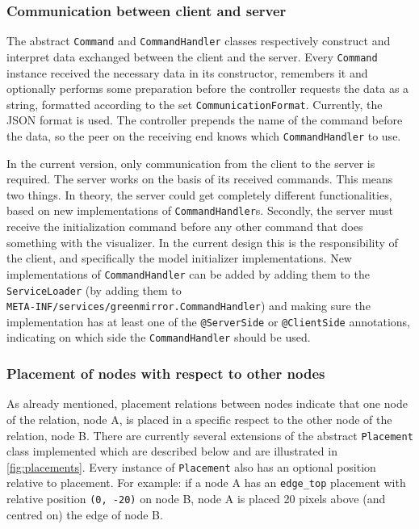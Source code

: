 \documentclass[a4paper]{article}
\begin{document}
\subsubsection{Communication between client and server}\label{subsubsec:communication}
The abstract \lstinline{Command} and \lstinline{CommandHandler} classes respectively construct and interpret data exchanged between the client and the server. Every \lstinline{Command} instance received the necessary data in its constructor, remembers it and optionally performs some preparation before the controller requests the data as a string, formatted according to the set \lstinline{CommunicationFormat}. Currently, the JSON format is used. The controller prepends the name of the command before the data, so the peer on the receiving end knows which \lstinline{CommandHandler} to use.

In the current version, only communication from the client to the server is required. The server works on the basis of its received commands. This means two things. In theory, the server could get completely different functionalities, based on new implementations of \lstinline{CommandHandler}s. Secondly, the server must receive the initialization command before any other command that does something with the visualizer. In the current design this is the responsibility of the client, and specifically the model initializer implementations. New implementations of \lstinline{CommandHandler} can be added by adding them to the \lstinline{ServiceLoader} (by adding them to \\ 
\lstinline{META-INF/services/greenmirror.CommandHandler}) and making sure the implementation has at least one of the \lstinline{@ServerSide} or \lstinline{@ClientSide} annotations, indicating on which side the \lstinline{CommandHandler} should be used.



\subsubsection{Placement of nodes with respect to other nodes}\label{subsubsec:placement}
As already mentioned, placement relations between nodes indicate that one node of the relation, node A, is placed in a specific respect to the other node of the relation, node B. There are currently several extensions of the abstract \lstinline{Placement} class implemented which are described below and are illustrated in \cref{fig:placements}. Every instance of \lstinline{Placement} also has an optional  position relative to placement. For example: if a node A has an \lstinline{edge_top} placement with relative position \lstinline{(0, -20)} on node B, node A is placed 20 pixels above (and centred on) the edge of node B.
\end{document}
